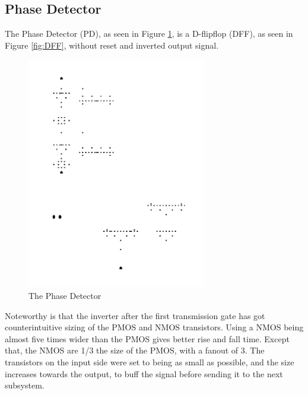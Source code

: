 \documentclass[a4paper,12pt]{article} \usepackage{graphicx}
\begin{document}
\subsection{Phase Detector}
The Phase Detector (PD), as seen in Figure \ref{fig:PD}, is a D-flipflop (DFF), as seen in Figure \ref{fig:DFF}, without
reset and inverted output signal.

\begin{figure}[h]
\centering
\includegraphics[width=0.7\textwidth, angle = 270]{../Bilder/Phase_detector_trans.png}
\caption{The Phase Detector}
\label{fig:PD}
\end{figure}

Noteworthy is that the inverter after the first transmission gate has got counterintuitive sizing of the PMOS and NMOS transistors.
Using a NMOS being almost five times wider than the PMOS gives better rise and fall time. Except that, the NMOS are 1/3 the size of the
PMOS, with a fanout of 3. The transistors on the input side were set to being as small as possible, and the size increases towards the
output, to buff the signal before sending it to the next subsystem.
\end{document}

